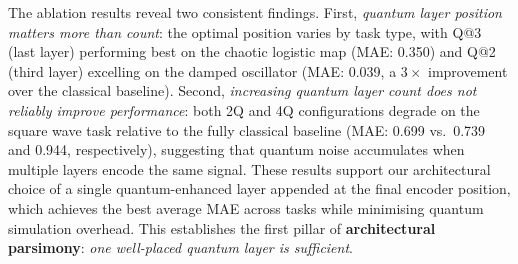 \documentclass[conference]{IEEEtran}
\begin{document}
\begin{table}[h]
\centering
\caption{Ablation study: effect of quantum layer position and count on MAE / MSE (seed=42). ``Q@$i$'' denotes a single quantum layer at position $i$; ``$k$Q'' denotes $k$ quantum layers. Best result per task in \textbf{bold}.}
\label{tab:ablation}
\end{table}

The ablation results reveal two consistent findings. First, \textit{quantum layer position matters more than count}: the optimal position varies by task type, with Q@3 (last layer) performing best on the chaotic logistic map (MAE: 0.350) and Q@2 (third layer) excelling on the damped oscillator (MAE: 0.039, a $3\times$ improvement over the classical baseline). Second, \textit{increasing quantum layer count does not reliably improve performance}: both 2Q and 4Q configurations degrade on the square wave task relative to the fully classical baseline (MAE: 0.699 vs.\ 0.739 and 0.944, respectively), suggesting that quantum noise accumulates when multiple layers encode the same signal. These results support our architectural choice of a single quantum-enhanced layer appended at the final encoder position, which achieves the best average MAE across tasks while minimising quantum simulation overhead. This establishes the first pillar of \textbf{architectural parsimony}: \textit{one well-placed quantum layer is sufficient}.
\end{document}
